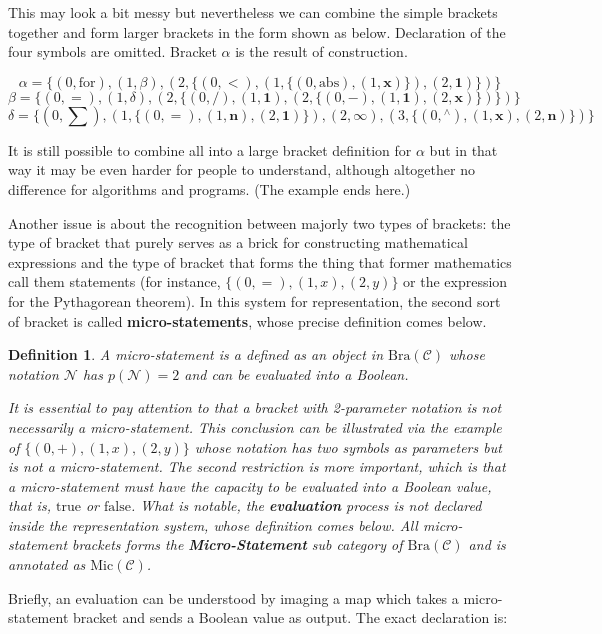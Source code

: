 \documentclass{article}
\newtheorem{definition}{Definition}
\begin{document}
This may look a bit messy but nevertheless we can combine the simple brackets together and form larger brackets in the form shown as below. Declaration of the four symbols are omitted. Bracket \(\alpha\) is the result of construction.

\[\alpha =\{(0,\text{for}),(1,\beta ),(2,\{(0,<),(1,\{(0,\text{abs}),(1,\pmb{x})\}),(2,\pmb{1})\})\}\]
\[\beta =\{(0,=),(1,\delta ),(2,\{(0,/),(1,\pmb{1}),(2,\{(0,-),(1,\pmb{1}),(2,\pmb{x})\})\})\}\]
\[\delta =\{(0,\sum ),(1,\{(0,=),(1,\pmb{n}),(2,\pmb{1})\}),(2,\pmb{\infty }), (3,\{(0,{}^{\wedge}),(1,\pmb{x}),(2,\pmb{n})\})\}\]

It is still possible to combine all into a large bracket definition for \(\alpha\) but in that way it may be even harder for people to understand, although altogether no difference for algorithms and programs. (The example ends here.)

Another issue is about the recognition between majorly two types of brackets: the type of bracket that purely serves as a brick for constructing mathematical expressions and the type of bracket that forms the thing that former mathematics call them statements (for instance, \(\{(0,=),(1,x),(2,y)\}\) or the expression for the Pythagorean theorem). In this system for representation, the second sort of bracket is called \textbf{ micro-statements}, whose precise definition comes below.

\begin{definition}
	A micro-statement is a defined as an object in \(\text{Bra}(\mathcal{C})\) whose notation \(\mathcal{N}\) has \(\mathit{p}(\mathcal{N})=2\) and can be evaluated into a Boolean.
	
	It is essential to pay attention to that a bracket with 2-parameter notation is not necessarily a micro-statement. This conclusion can be illustrated via the example of \(\{(0,+),(1,x),(2,y)\}\) whose notation has two symbols as parameters but is not a micro-statement. The second restriction is more important, which is that a micro-statement must have the capacity to be evaluated into a Boolean value, that is, \(\text{true}\) or \(\text{false}\). What is notable, the \textbf{ evaluation} process is not declared inside the representation system, whose definition comes below. All micro-statement brackets forms the \textbf{ Micro-Statement }sub category of \(\text{Bra}(\mathcal{C})\) and is annotated as \(\text{Mic}(\mathcal{C})\).
\end{definition}

 Briefly, an evaluation can be understood by imaging a map which takes a micro-statement bracket and sends a Boolean value as output. The exact declaration is:
\end{document}
